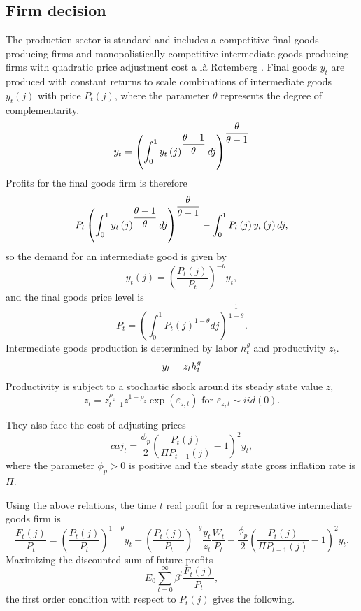 \documentclass[]{article}
\begin{document}
\subsection{Firm decision}

The production sector is standard and includes a competitive final goods
producing firms and monopolistically competitive intermediate goods
producing firms with quadratic price adjustment cost a l\`a  Rotemberg \textcite{rotemberg1982stickyprices}.
Final goods $y_{t}$ are produced with constant returns to scale combinations
of intermediate goods $y_{t}\left( j\right) $ with price $P_{t}\left(
j\right) $, where the parameter $\theta $ represents the degree of
complementarity.%
\[
y_{t}=\left(\int\nolimits_{0}^{1}y_{t}\left( j\right)^{\dfrac{\theta-1}{%
\theta}}dj\right)^{\dfrac{\theta}{\theta-1}} 
\]%
Profits for the final goods firm is therefore%
\[
P_{t}\left( \int\nolimits_{0}^{1}y_{t}\left( j\right) ^{\dfrac{\theta -1}{%
\theta }}dj\right) ^{\dfrac{\theta }{\theta -1}}-\int\nolimits_{0}^{1}P_{t}%
\left( j\right) y_{t}\left( j\right) dj, 
\]%
so the demand for an intermediate good is given by%
\[
y_{t}\left( j\right) =\left( \frac{P_{t}\left( j\right) }{P_{t}}\right)
^{-\theta }y_{t}, 
\]%
and the final goods price level is
\[
P_{t}=\left( \int\nolimits_{0}^{1}P_{t}\left( j\right) ^{1-\theta
}dj\right) ^{\dfrac{1}{1-\theta }}.
\]
Intermediate goods production is determined by labor $h_{t}^{g}$ and productivity $z_{t}$.
\begin{equation}
y_{t}=z_{t}h_{t}^{g} \label{prod} \\
\end{equation}%
Productivity is subject to a stochastic shock around its steady state value $z$,
\begin{equation}
z_{t}=z_{t-1}^{\rho_{z}}z^{1-\rho_{z}}\exp(\varepsilon_{z,t}) \text{ for }\varepsilon_{z,t}\sim
iid\left( 0\right).
\label{z}
\end{equation}%

They also face the cost of adjusting prices%
\[
caj_{t}=\frac{\phi _{p}}{2}\left( \frac{P_{t}\left( j\right) }{\Pi
P_{t-1}\left( j\right) }-1\right) ^{2} y_{t}, 
\]%
where the parameter $\phi _{p}>0$ is positive and the steady state gross inflation
rate is $\Pi $.

Using the above relations, the time $t$ real profit for a representative
intermediate goods firm is%
\[
\frac{F_{t}\left( j\right) }{P_{t}}=\left( \frac{P_{t}\left( j\right) }{P_{t}%
}\right) ^{1-\theta }y_{t}-\left( \frac{P_{t}\left( j\right) }{P_{t}}\right)
^{-\theta }\frac{y_{t}}{z_{t}}\frac{W_{t}}{P_{t}}-\frac{\phi _{p}}{2}\left(
\frac{P_{t}\left( j\right) }{\Pi P_{t-1}\left( j\right) }%
-1\right) ^{2}y_{t}.
\]%
Maximizing the discounted sum of future profits%
\[
E_{0}\sum\limits_{t=0}^{\infty }\beta ^{t}\frac{F_{t}\left( j\right) }{P_{t}%
},
\]%
the first order condition with respect to $P_{t}\left( j\right) $ gives the
following.%
\end{document}
